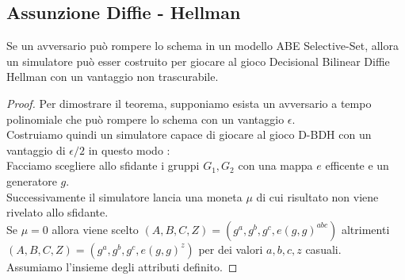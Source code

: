 
\subsection{Assunzione Diffie - Hellman}

\begin{thm}
Se un avversario può rompere lo schema in un modello ABE Selective-Set, allora un simulatore può esser costruito per giocare al gioco Decisional Bilinear Diffie Hellman con un vantaggio non trascurabile.
\begin{proof}
Per dimostrare il teorema, supponiamo esista un avversario  a tempo polinomiale che può rompere lo schema con un vantaggio $\epsilon$.\\
Costruiamo quindi un simulatore  capace di giocare al gioco D-BDH con un vantaggio di $\epsilon / 2$ in questo modo :\\[0,5cm]

Facciamo scegliere allo sfidante i gruppi $G_1, G_2$ con una mappa $e$ efficente e un generatore $g$.\\
Successivamente il simulatore lancia una moneta $\mu$ di cui risultato non viene rivelato allo sfidante.\\
Se $ \mu = 0$ allora viene scelto $(A,B,C,Z) = (g^a,g^b,g^c,e(g,g)^{abc})$ altrimenti $(A,B,C,Z) = (g^a,g^b,g^c, e(g,g)^z)$ per dei valori $a,b,c,z$ casuali.\\
Assumiamo l'insieme degli attributi  definito.


\end{proof}
\end{thm}
